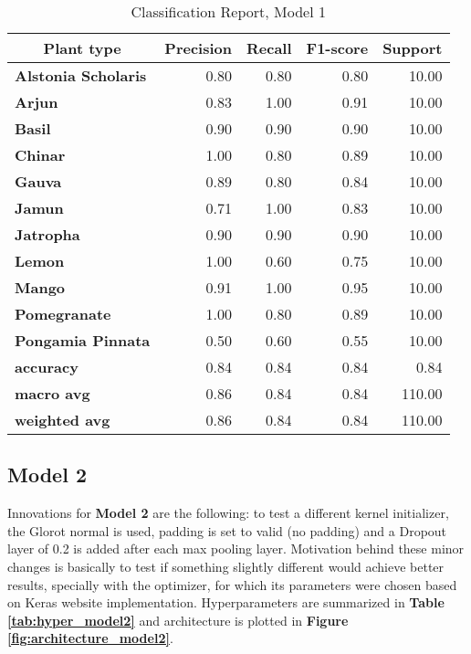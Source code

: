 \documentclass[11pt]{article}
\begin{document}
\begin{table}[H]
\centering

\begin{tabular}{lrrrr}
\toprule
\multicolumn{1}{c}{\textbf{Plant type}} & \multicolumn{1}{c}{\textbf{Precision}} & \multicolumn{1}{c}{\textbf{Recall}} & \multicolumn{1}{c}{\textbf{F1-score}} & \multicolumn{1}{c}{\textbf{Support}}\\
\midrule
\textbf{Alstonia Scholaris} &       0.80 &    0.80 &      0.80 &    10.00 \\
\textbf{Arjun             } &       0.83 &    1.00 &      0.91 &    10.00 \\
\textbf{Basil             } &       0.90 &    0.90 &      0.90 &    10.00 \\
\textbf{Chinar            } &       1.00 &    0.80 &      0.89 &    10.00 \\
\textbf{Gauva             } &       0.89 &    0.80 &      0.84 &    10.00 \\
\textbf{Jamun             } &       0.71 &    1.00 &      0.83 &    10.00 \\
\textbf{Jatropha          } &       0.90 &    0.90 &      0.90 &    10.00 \\
\textbf{Lemon             } &       1.00 &    0.60 &      0.75 &    10.00 \\
\textbf{Mango             } &       0.91 &    1.00 &      0.95 &    10.00 \\
\textbf{Pomegranate       } &       1.00 &    0.80 &      0.89 &    10.00 \\
\textbf{Pongamia Pinnata  } &       0.50 &    0.60 &      0.55 &    10.00 \\ \hline
\textbf{accuracy          } &       0.84 &    0.84 &      0.84 &     0.84 \\
\textbf{macro avg         } &       0.86 &    0.84 &      0.84 &   110.00 \\
\textbf{weighted avg      } &       0.86 &    0.84 &      0.84 &   110.00 \\
\bottomrule
\end{tabular}
\caption{Classification Report, Model 1}\label{tab:report_model1}
\end{table}

\subsection{Model 2}

Innovations for \textbf{Model 2} are the following: to test a different kernel initializer, the Glorot normal is used, padding is set to valid (no padding) and a Dropout layer of 0.2 is added after each max pooling layer.  Motivation behind these minor changes is basically to test if something slightly different would achieve better results, specially with the optimizer, for which its parameters were chosen based on Keras website implementation. Hyperparameters are summarized in \textbf{Table \ref{tab:hyper_model2}} and architecture is plotted in \textbf{Figure \ref{fig:architecture_model2}}.\\
\end{document}
